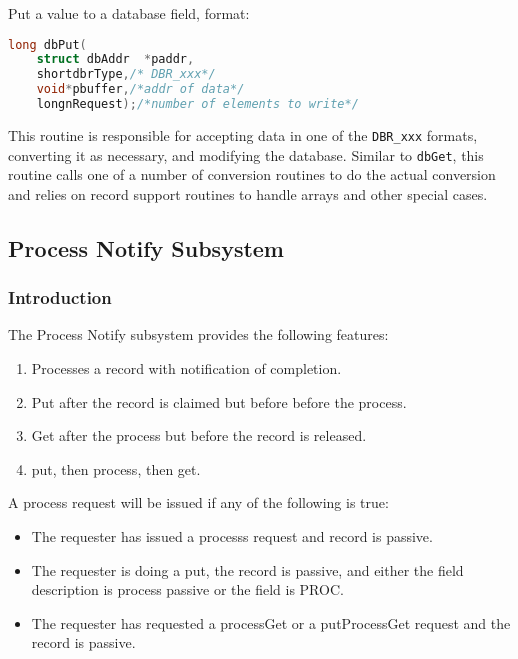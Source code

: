 Put a value to a database field, format:

\begin{lstlisting}[language=C]
long dbPut(
    struct dbAddr  *paddr,
    shortdbrType,/* DBR_xxx*/
    void*pbuffer,/*addr of data*/
    longnRequest);/*number of elements to write*/
\end{lstlisting}

This routine is responsible for accepting data in one of the \verb|DBR_xxx| formats, converting it as necessary, and modifying 
the database.
Similar to \verb|dbGet|, this routine calls one of a number of conversion routines to do the actual conversion and relies on record support routines to handle arrays and other special cases.

\label{Process Notify Subsystem}
\subsection{Process Notify Subsystem}

\subsubsection{Introduction}

The Process Notify subsystem provides the following features:

\begin{enumerate}

\item Processes a record with notification of completion.

\item Put after the record is claimed but before before the process.

\item Get after the process but before the record is released.

\item put, then process, then get.

\end{enumerate}

A process request will be issued if any of the following is true:

\begin{itemize}

\item The requester has issued a processs request and record is passive.

\item The requester is doing a put, the record is passive, and either the field description is process passive or the field is PROC.

\item The requester has requested a processGet or a putProcessGet request and the record is passive.

\end{itemize}


